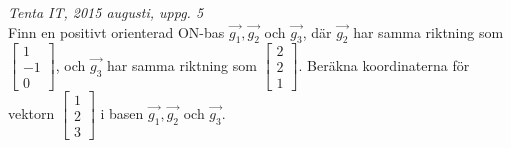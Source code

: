 {\it Tenta IT, 2015 augusti, uppg. 5}\\
Finn en positivt orienterad ON-bas $\vec{g_1},\vec{g_2}$ och $\vec{g_3}$, där $\vec{g_2}$ har samma riktning som $\begin{bmatrix}1\\-1\\0\end{bmatrix}$, och $\vec{g_3}$ har samma riktning som $\begin{bmatrix}2\\2\\1\end{bmatrix}$. Beräkna koordinaterna för vektorn $\begin{bmatrix}1\\2\\3\end{bmatrix}$ i basen $\vec{g_1},\vec{g_2}$ och $\vec{g_3}$.
